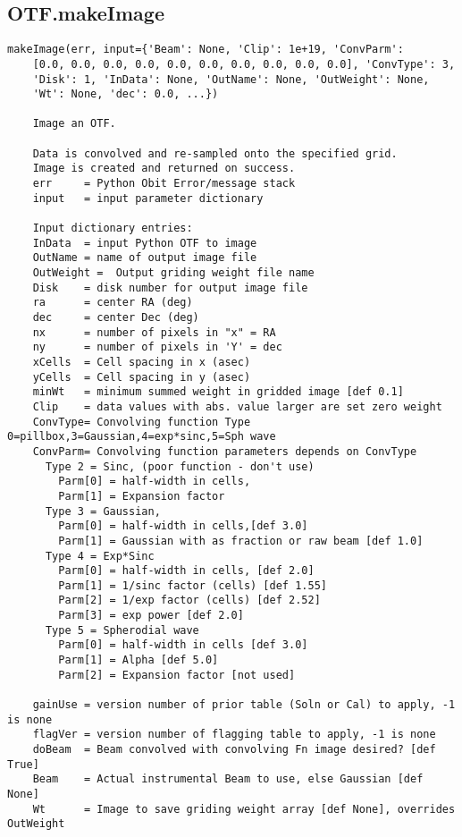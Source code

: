 \documentclass[11pt]{report}
\begin{document}
\subsection{OTF.makeImage}
\begin{verbatim}
makeImage(err, input={'Beam': None, 'Clip': 1e+19, 'ConvParm': 
    [0.0, 0.0, 0.0, 0.0, 0.0, 0.0, 0.0, 0.0, 0.0, 0.0], 'ConvType': 3,
    'Disk': 1, 'InData': None, 'OutName': None, 'OutWeight': None, 
    'Wt': None, 'dec': 0.0, ...})

    Image an OTF.
    
    Data is convolved and re-sampled onto the specified grid.
    Image is created and returned on success.
    err     = Python Obit Error/message stack
    input   = input parameter dictionary
    
    Input dictionary entries:
    InData  = input Python OTF to image
    OutName = name of output image file
    OutWeight =  Output griding weight file name
    Disk    = disk number for output image file
    ra      = center RA (deg)
    dec     = center Dec (deg)
    nx      = number of pixels in "x" = RA
    ny      = number of pixels in 'Y' = dec
    xCells  = Cell spacing in x (asec)
    yCells  = Cell spacing in y (asec)
    minWt   = minimum summed weight in gridded image [def 0.1]
    Clip    = data values with abs. value larger are set zero weight
    ConvType= Convolving function Type 0=pillbox,3=Gaussian,4=exp*sinc,5=Sph wave
    ConvParm= Convolving function parameters depends on ConvType
      Type 2 = Sinc, (poor function - don't use)
        Parm[0] = half-width in cells,
        Parm[1] = Expansion factor
      Type 3 = Gaussian,
        Parm[0] = half-width in cells,[def 3.0]
        Parm[1] = Gaussian with as fraction or raw beam [def 1.0]
      Type 4 = Exp*Sinc
        Parm[0] = half-width in cells, [def 2.0]
        Parm[1] = 1/sinc factor (cells) [def 1.55]
        Parm[2] = 1/exp factor (cells) [def 2.52]
        Parm[3] = exp power [def 2.0]
      Type 5 = Spherodial wave 
        Parm[0] = half-width in cells [def 3.0]
        Parm[1] = Alpha [def 5.0]
        Parm[2] = Expansion factor [not used]
    
    gainUse = version number of prior table (Soln or Cal) to apply, -1 is none
    flagVer = version number of flagging table to apply, -1 is none
    doBeam  = Beam convolved with convolving Fn image desired? [def True]
    Beam    = Actual instrumental Beam to use, else Gaussian [def None]
    Wt      = Image to save griding weight array [def None], overrides OutWeight
\end{verbatim}
\end{document}
